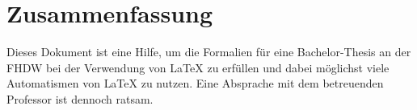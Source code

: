 \section{Zusammenfassung}

Dieses Dokument ist eine Hilfe, um die Formalien für eine Bachelor-Thesis an der
FHDW bei der Verwendung von {\LaTeX} zu erfüllen und dabei möglichst viele Automatismen von {\LaTeX} zu nutzen. Eine Absprache mit dem betreuenden Professor ist dennoch ratsam.
